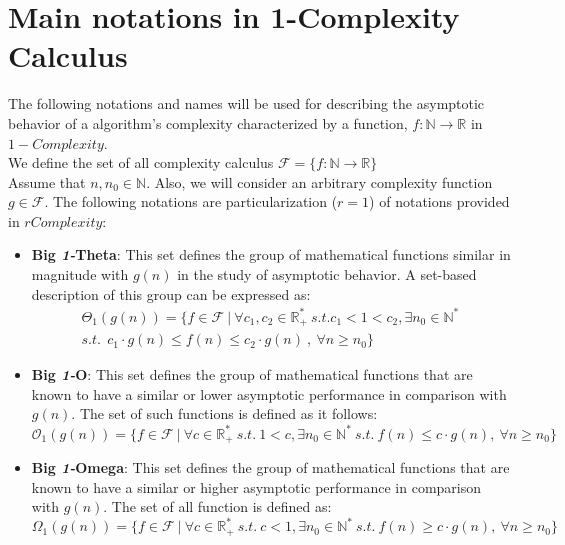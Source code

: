 \section{Main notations in 1-Complexity Calculus}
The following notations and names will be used for describing the asymptotic behavior of a algorithm's complexity characterized by a function, $f:\mathbb{N}\longrightarrow\mathbb{R}$ in $1-Complexity$. \\
We define the set of all complexity calculus $\mathcal{F}= \lbrace f:\mathbb{N}\longrightarrow\mathbb{R} \rbrace$
\\Assume that $n, n_{0}\in\mathbb{N}$. Also, we will consider an arbitrary complexity function $g \in \mathcal{F}$. 
The following notations are particularization ($r = 1$) of notations provided in $rComplexity$:
\begin{itemize}
  \item \textbf{Big \textit{1-}Theta}: This set defines the group of mathematical functions similar in magnitude with  $g(n)$ in the study of asymptotic behavior. A set-based description of this group can be expressed as:
  \[\begin{split} \Theta_{1}(g(n)) = \lbrace f \in \mathcal{F}\ |\ \forall c_{1}, c_{2} \in \mathbb{R}^{*}_{+} \ s.t.  c_{1} < 1 < c_{2} , \exists n_{0} \in \mathbb{N}^{*}\ \\ s.t.\ \ c_{1} \cdot g(n) \leq f(n) \leq c_{2} \cdot g(n)\ ,\  \forall n \geq n_{0} \rbrace \end{split} \]
  
  \item \textbf{Big \textit{1-}O}: This set defines the group of mathematical functions that are known to have a similar or lower
 asymptotic performance in comparison with  $g(n)$. The set of such functions is defined as it follows:
  \[\mathcal{O}_{1}(g(n)) = \lbrace f \in \mathcal{F}\ |\ \forall c  \in \mathbb{R}^{*}_{+} \ s.t.\  1 < c, \exists n_{0} \in \mathbb{N}^{*}\ s.t.\  f(n) \leq c \cdot g(n),\  \forall n \geq n_{0} \rbrace\]
  
  \item \textbf{Big \textit{1-}Omega}: This set defines the group of mathematical functions that are known to have a similar or higher asymptotic performance in comparison with  $g(n)$. The set of all function is defined as:
    \[\Omega_{1}(g(n)) = \lbrace f \in \mathcal{F}\ |\ \forall c  \in \mathbb{R}^{*}_{+}\ s.t. \ c < 1, \exists n_{0} \in \mathbb{N}^{*}\ s.t.\  f(n) \geq c \cdot g(n),\  \forall n \geq n_{0} \rbrace\]


\end{itemize}
